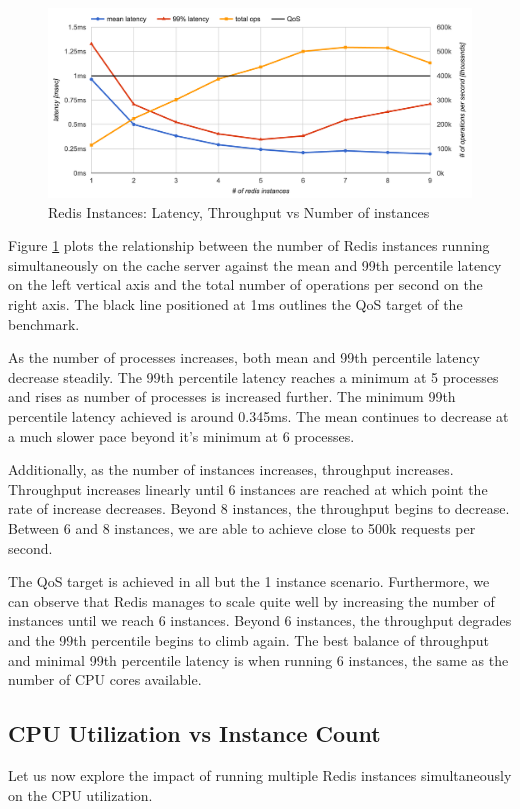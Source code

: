 \begin{figure}[h]
    \includegraphics[width=\textwidth]{./res/6_instances_latency_ops.png}
    \caption{Redis Instances: Latency, Throughput vs Number of instances}
    \label{fig:redis-instances-latency-ops}
\end{figure}

Figure \ref{fig:redis-instances-latency-ops} plots the relationship between the number of Redis instances running simultaneously on the cache server against the mean and 99th percentile latency on the left vertical axis and the total number of operations per second on the right axis. The black line positioned at 1ms outlines the QoS target of the benchmark.

As the number of processes increases, both mean and 99th percentile latency decrease steadily. The 99th percentile latency reaches a minimum at 5 processes and rises as number of processes is increased further. The minimum 99th percentile latency achieved is around 0.345ms. The mean continues to decrease at a much slower pace beyond it's minimum at 6 processes.

Additionally, as the number of instances increases, throughput increases. Throughput increases linearly until 6 instances are reached at which point the rate of increase decreases. Beyond 8 instances, the throughput begins to decrease. Between 6 and 8 instances, we are able to achieve close to 500k requests per second.

The QoS target is achieved in all but the 1 instance scenario. Furthermore, we can observe that Redis manages to scale quite well by increasing the number of instances until we reach 6 instances. Beyond 6 instances, the throughput degrades and the 99th percentile begins to climb again. The best balance of throughput and minimal 99th percentile latency is when running 6 instances, the same as the number of CPU cores available.

\subsection{CPU Utilization vs Instance Count}
Let us now explore the impact of running multiple Redis instances simultaneously on the CPU utilization.

